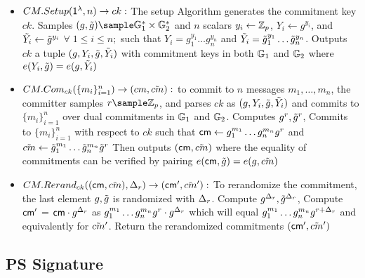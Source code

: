 \begin{itemize}
    \item $CM.Setup(\mathsf{1^{\lambda}}, n) \to ck:$ The setup Algorithm generates the commitment key $ck$. Samples $(g, \tilg) \sample \G_1^* \times \G_2^*$ and $n$ scalars $y_i \gets \mathbb{Z}_p$, $Y_i \gets g^{y_i}$, and $\tilde{Y}_i \gets \tilde{g}^{y_i}$ $\forall \; 1 \leq i \leq n;$ such that $Y_i = g_1^{y_1}\dots g_n^{y_n}$ and $\tilde{Y}_i = \tilde{g}_1^{y_1}\dots \tilde{g}_n^{y_n}$. Outputs $ck$ a tuple $(g, Y_i, \tilde{g}, \tilde{Y}_i)$ with commitment keys in both $\mathbb{G}_1$ and $\mathbb{G}_2$ where $e(Y_i,\tilde{g}) = e(g,\tilde{Y}_i)$

    \item $CM.Com_{ck}(\{m_i\}^n_{i=1}) \to (cm, \tilde{cm}):$ to commit to $n$ messages $m_1, \dots, m_n$, the committer samples $r \sample \Zp$, and parses $ck$ as $(g, Y_i, \tilde{g}, \tilde{Y}_i)$ and commits to $\{m_i\}^n_{i=1}$ over dual commitments in $\mathbb{G}_1$ and $\mathbb{G}_2$. Computes $g^r, \tilde{g}^r$, Commits to $\{m_i\}^n_{i=1}$ with respect to $ck$ such that $\mathsf{cm} \gets g_1^{m_1}\dots g_n^{m_n} g^r$ and $\tilde{cm} \gets \tilde{g}_1^{m_1} \dots \tilde{g}_n^{m_n}\tilde{g}^r$ Then outputs $(\mathsf{cm}, \tilde{cm})$ where the equality of commitments can be verified by pairing $e(\mathsf{cm}, \tilde{g}) = e(g, \tilde{cm})$
    
    \item $CM.Rerand_{ck}((\mathsf{cm}, \tilde{cm}), \Delta_r) \to (\mathsf{cm}', \tilde{cm}'):$ To rerandomize the commitment, the last element $g, \tilde{g}$ is randomized with $\Delta_r$. Compute $g^{\Delta_r}, \tilde{g}^{\Delta_r}$, Compute $\mathsf{cm}'$ = $\mathsf{cm} \cdot g^{\Delta_r}$ as $g_1^{m_1}\dots g_n^{m_n} g^r \cdot g^{\Delta_r}$ which will equal $g_1^{m_1}\dots g_n^{m_n} g^{r + \Delta_r}$ and equivalently for $\tilde{cm}'$. Return the rerandomized commitments $(\mathsf{cm}', \tilde{cm}')$
    
\end{itemize}






\subsection{PS Signature}
